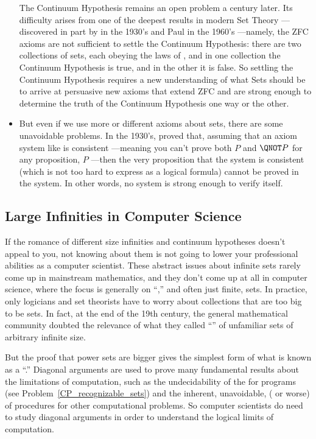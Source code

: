 \begin{itemize}
  The Continuum Hypothesis remains an open problem a century later.  Its
  difficulty arises from one of the deepest results in modern Set Theory
  ---discovered in part by  in the 1930's and Paul
   in the 1960's ---namely, the ZFC axioms are not sufficient
  to settle the Continuum Hypothesis: there are two collections of sets,
  each obeying the laws of , and in one collection the Continuum
  Hypothesis is true, and in the other it is false.  So settling the
  Continuum Hypothesis requires a new understanding of what Sets should be
  to arrive at persuasive new axioms that extend ZFC and are strong enough
  to determine the truth of the Continuum Hypothesis one way or the other.

\item But even if we use more or different axioms about sets, there are
  some unavoidable problems.  In the 1930's,  proved that,
  assuming that an axiom system like  is consistent ---meaning
  you can't prove both $P$ and $\QNOT P$ for any proposition, $P$ ---then
  the very proposition that the system is consistent (which is not too
  hard to express as a logical formula) cannot be proved in the system.
  In other words, no  system is strong enough to verify
  itself.
  
\end{itemize}

\subsection{Large Infinities in Computer Science}

If the romance of different size infinities and continuum hypotheses
doesn't appeal to you, not knowing about them is not going to lower your
professional abilities as a computer scientist.  These abstract issues
about infinite sets rarely come up in mainstream mathematics, and they
don't come up at all in computer science, where the focus is generally on
``,'' and often just finite, sets.  In practice, only
logicians and set theorists have to worry about collections that are too
big to be sets.  In fact, at the end of the 19th century, the general
mathematical community doubted the relevance of what they called
``'' of unfamiliar sets of arbitrary infinite size.

But the proof that power sets are bigger gives the simplest form of what
is known as a ``.''  Diagonal arguments are used to
prove many fundamental results about the limitations of computation, such
as the undecidability of the  for programs (see
Problem~\ref{CP_recognizable_sets}) and the inherent, unavoidable,
 ( or worse) of procedures for
other computational problems.  So computer scientists do need to study
diagonal arguments in order to understand the logical limits of
computation.

